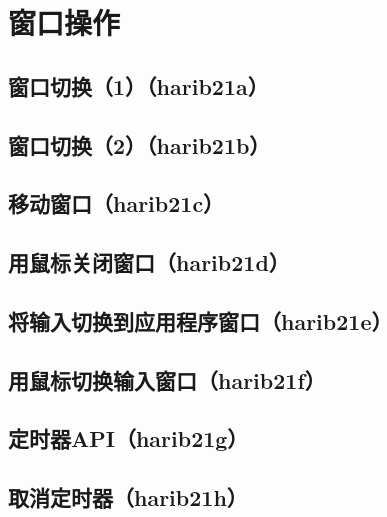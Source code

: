 ﻿\chapter{	窗口操作	}
\section{	窗口切换（1）（harib21a）	}
\section{	窗口切换（2）（harib21b）	}
\section{	移动窗口（harib21c）	}
\section{	用鼠标关闭窗口（harib21d）	}
\section{	将输入切换到应用程序窗口（harib21e）	}
\section{	用鼠标切换输入窗口（harib21f）	}
\section{	定时器API（harib21g）	}
\section{	取消定时器（harib21h）	}

